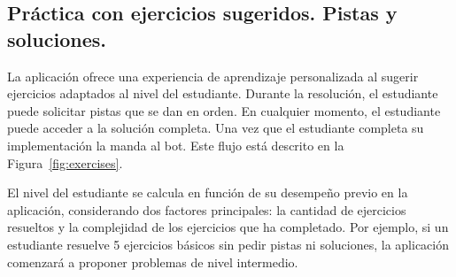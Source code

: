 \documentclass{article}
\begin{document}
\subsection{Práctica con ejercicios sugeridos. Pistas y soluciones.}

La aplicación ofrece una experiencia de aprendizaje personalizada al sugerir ejercicios adaptados al nivel del estudiante. Durante la resolución, el estudiante puede solicitar pistas que se dan en orden. En cualquier momento, el estudiante puede acceder a la solución completa. Una vez que el estudiante completa su implementación la manda al bot. Este flujo está descrito en la Figura~\ref{fig:exercises}.

El nivel del estudiante se calcula en función de su desempeño previo en la aplicación, considerando dos factores principales: la cantidad de ejercicios resueltos y la complejidad de los ejercicios que ha completado. Por ejemplo, si un estudiante resuelve 5 ejercicios básicos sin pedir pistas ni soluciones, la aplicación comenzará a proponer problemas de nivel intermedio.
\end{document}
